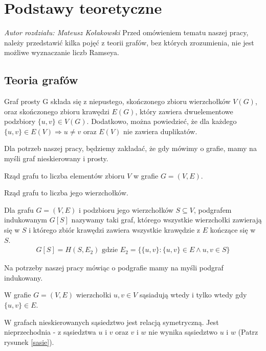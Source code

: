 \chapter{Podstawy teoretyczne} 
\textit{Autor rozdziału: Mateusz Kołakowski}
\vspace{0.5cm}\newline
Przed omówieniem tematu naszej pracy, należy przedstawić kilka pojęć z teorii grafów, bez których zrozumienia, nie jest możliwe wyznaczanie liczb Ramseya.

  \section{Teoria grafów}
  \begin{definition}
    Graf prosty G składa się z niepustego, skończonego zbioru wierzchołków $V(G)$, oraz skończonego zbioru krawędzi $E(G)$, który zawiera dwuelementowe podzbiory $\{u,v\} \in V(G)$. Dodatkowo, można powiedzieć, że dla każdego $\{u,v\} \in E(V) \Rightarrow u \neq v$ oraz $E(V)$ nie zawiera duplikatów. \cite{graphtheory}
  \end{definition}

  Dla potrzeb naszej pracy, będziemy zakładać, że gdy mówimy o grafie, mamy na myśli graf nieskierowany i prosty.
  
  \begin{definition}
   Rząd grafu to liczba elementów zbioru $V$ w grafie $G=(V, E)$.
  \end{definition}

  Rząd grafu to liczba jego wierzchołków. 
  
       \begin{definition}
       Dla grafu $G=(V,E)$ i podzbioru jego wierzchołków $S \subseteq V$, 
       podgrafem indukowanym $G[S]$ nazywamy taki graf, którego wszystkie wierzchołki
       zawierają się w $S$ i którego zbiór krawędzi zawiera wszystkie krawędzie z $E$ kończące się w $S$. 
       \begin{align*}
       G[S] = H(S, E_2) \textrm{ gdzie }  E_2=\{\{u,v\}:\{u,v\} \in E \wedge u,v \in S\}
       \end{align*}
     \end{definition}

     Na potrzeby naszej pracy mówiąc o podgrafie mamy na myśli podgraf indukowany.

  \begin{definition}[Sąsiedztwo]
    W grafie $G=(V, E)$ wierzchołki $u, v \in V$ sąsiadują wtedy i tylko wtedy gdy $\{u, v\} \in E$.    
  \end{definition}
  W grafach nieskierowanych sąsiedztwo jest relacją symetryczną. Jest nieprzechodnia - z sąsiedztwa $u$ i $v$ oraz $v$ i $w$ nie wynika sąsiedztwo $u$ i $w$ (Patrz rysunek \ref{sasie}).


